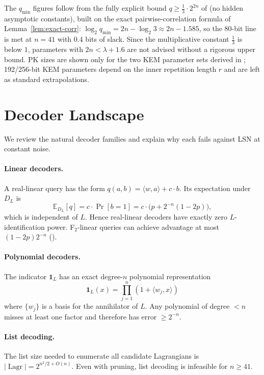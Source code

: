 \documentclass[11pt,a4paper]{article}
\theoremstyle{plain}
\theoremstyle{definition}
\newcommand{\E}{\mathbb{E}}
\DeclareMathOperator{\Lagr}{Lagr}
\begin{document}
The $q_{\min}$ figures follow from the fully explicit bound $q \ge \tfrac13 \cdot 2^{2n}$ of  (no hidden asymptotic constants), built on the exact pairwise-correlation formula of Lemma~\ref{lem:exact-corr}: $\log_2 q_{\min} = 2n - \log_2 3 \approx 2n - 1.585$, so the $80$-bit line is met at $n=41$ with $0.4$ bits of slack. Since the multiplicative constant $\tfrac13$ is below $1$, parameters with $2n < \lambda + 1.6$ are not advised without a rigorous upper bound. PK sizes are shown only for the two KEM parameter sets derived in ; 192/256-bit KEM parameters depend on the inner repetition length $r$ and are left as standard extrapolations.

\section{Decoder Landscape}
\label{sec:decoders}

We review the natural decoder families and explain why each fails against LSN at constant noise.

\paragraph{Linear decoders.}
A real-linear query has the form $q(a,b) = \langle w, a \rangle + c \cdot b$. Its expectation under $D_L$ is
\[
\E_{D_L}[q] = c \cdot \Pr[b=1] = c \cdot \bigl(p + 2^{-n}(1-2p)\bigr),
\]
which is independent of $L$. Hence real-linear decoders have exactly zero $L$-identification power. F$_2$-linear queries can achieve advantage at most $(1-2p)2^{-n}$ ().

\paragraph{Polynomial decoders.}
The indicator $\mathbf{1}_L$ has an exact degree-$n$ polynomial representation
\[
\mathbf{1}_L(x) = \prod_{j=1}^n (1 + \langle w_j, x \rangle)
\]
where $\{w_j\}$ is a basis for the annihilator of $L$. Any polynomial of degree $< n$ misses at least one factor and therefore has error $\geq 2^{-n}$.

\paragraph{List decoding.}
The list size needed to enumerate all candidate Lagrangians is $|\Lagr| = 2^{n^2/2 + O(n)}$. Even with pruning, list decoding is infeasible for $n \geq 41$.
\end{document}
